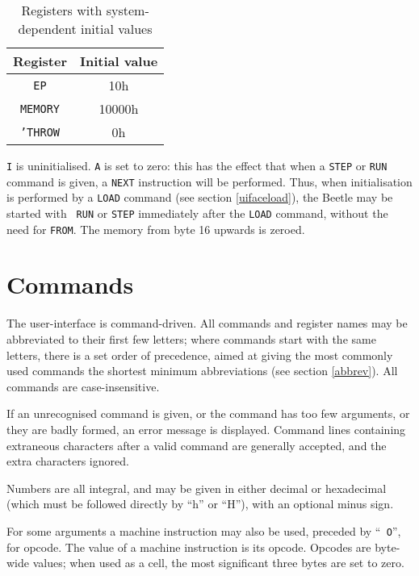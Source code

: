 \begin{table}[htbp]
\begin{center}
\begin{tabular}{|c|c|} \hline
\rule[-2mm]{0mm}{6mm}\bf Register & \bf Initial value \\ \hline
{\tt EP} & 10h \\
{\tt MEMORY} & 10000h \\
{\tt 'THROW} & 0h \\ \hline
\end{tabular}
\caption{\label{uinittable}Registers with system-dependent initial values}
\end{center}
\end{table}

{\tt I} is uninitialised. {\tt A} is set to zero: this has the effect that
when a {\tt STEP} or {\tt RUN} command is given, a {\tt NEXT} instruction
will be performed. Thus, when initialisation is performed by a {\tt LOAD}
command (see section \ref{uifaceload}), the Beetle may be started with {\tt
RUN} or {\tt STEP} immediately after the {\tt LOAD} command, without the need
for {\tt FROM}. The memory from byte 16 upwards is zeroed.


\section{Commands}
\label{commands}

The user-interface is command-driven. All commands and register names may be
abbreviated to their first few letters; where commands start with the same
letters, there is a set order of precedence, aimed at giving the most
commonly used commands the shortest minimum abbreviations (see section
\ref{abbrev}). All commands are case-insensitive.

If an unrecognised command is given, or the command has too few arguments, or
they are badly formed, an error message is displayed. Command lines
containing extraneous characters after a valid command are generally
accepted, and the extra characters ignored.

Numbers are all integral, and may be given in either decimal or hexadecimal
(which must be followed directly by ``h'' or ``H''), with an optional minus
sign.

For some arguments a machine instruction may also be used, preceded by ``{\tt
O}'', for opcode. The value of a machine instruction is its opcode. Opcodes
are byte-wide values; when used as a cell, the most significant three bytes
are set to zero.

